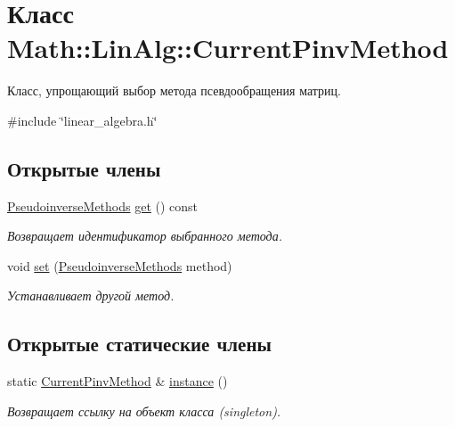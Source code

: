 \hypertarget{class_math_1_1_lin_alg_1_1_current_pinv_method}{}\section{Класс Math\+:\+:Lin\+Alg\+:\+:Current\+Pinv\+Method}
\label{class_math_1_1_lin_alg_1_1_current_pinv_method}


Класс, упрощающий выбор метода псевдообращения матриц.  




{\ttfamily \#include \char`\"{}linear\+\_\+algebra.\+h\char`\"{}}

\subsection*{Открытые члены}
\begin{DoxyCompactItemize}
\item 
\hypertarget{class_math_1_1_lin_alg_1_1_current_pinv_method_a6259004ad1c0c80f5798a3e7c12cf342}{}\label{class_math_1_1_lin_alg_1_1_current_pinv_method_a6259004ad1c0c80f5798a3e7c12cf342} 
\hyperlink{namespace_math_1_1_lin_alg_a34ee452c5d64eeb10e1bb63cf887af17}{Pseudoinverse\+Methods} \hyperlink{class_math_1_1_lin_alg_1_1_current_pinv_method_a6259004ad1c0c80f5798a3e7c12cf342}{get} () const
\begin{DoxyCompactList}\small\item\em Возвращает идентификатор выбранного метода. \end{DoxyCompactList}\item 
\hypertarget{class_math_1_1_lin_alg_1_1_current_pinv_method_ade16b67d5062f609bb8488f2ed78f0f3}{}\label{class_math_1_1_lin_alg_1_1_current_pinv_method_ade16b67d5062f609bb8488f2ed78f0f3} 
void \hyperlink{class_math_1_1_lin_alg_1_1_current_pinv_method_ade16b67d5062f609bb8488f2ed78f0f3}{set} (\hyperlink{namespace_math_1_1_lin_alg_a34ee452c5d64eeb10e1bb63cf887af17}{Pseudoinverse\+Methods} method)
\begin{DoxyCompactList}\small\item\em Устанавливает другой метод. \end{DoxyCompactList}\end{DoxyCompactItemize}
\subsection*{Открытые статические члены}
\begin{DoxyCompactItemize}
\item 
\hypertarget{class_math_1_1_lin_alg_1_1_current_pinv_method_a663575ba99f3a0a5359baacdcd410539}{}\label{class_math_1_1_lin_alg_1_1_current_pinv_method_a663575ba99f3a0a5359baacdcd410539} 
static \hyperlink{class_math_1_1_lin_alg_1_1_current_pinv_method}{Current\+Pinv\+Method} \& \hyperlink{class_math_1_1_lin_alg_1_1_current_pinv_method_a663575ba99f3a0a5359baacdcd410539}{instance} ()
\begin{DoxyCompactList}\small\item\em Возвращает ссылку на объект класса (singleton). \end{DoxyCompactList}\end{DoxyCompactItemize}
